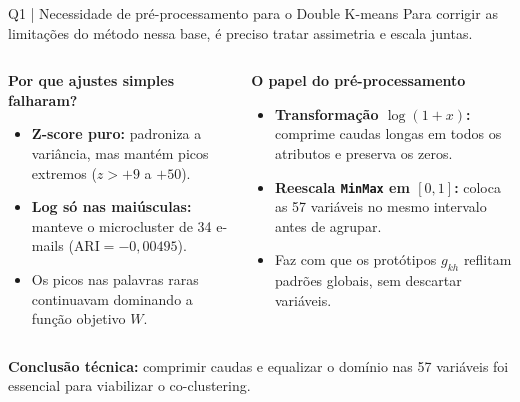 \documentclass[aspectratio=169,11pt]{beamer}
\begin{document}
\begin{frame}[t]{Q1 | Necessidade de pré-processamento para o Double K-means}
\small\color{cinzaescuro}Para corrigir as limitações do método nessa base, é preciso tratar assimetria e escala juntas.
\vspace{1mm}
\begin{columns}[T,onlytextwidth]
\begin{simplebox}
\textbf{Por que ajustes simples falharam?}\par\vspace{1mm}
\footnotesize
\begin{itemize}\setlength\itemsep{1.2mm}
\item \textbf{Z-score puro:} padroniza a variância, mas mantém picos extremos ($z > +9$ a $+50$).
\item \textbf{Log só nas maiúsculas:} manteve o microcluster de 34 e-mails ($\text{ARI} = -0,00495$).
\item Os picos nas palavras raras continuavam dominando a função objetivo $W$.
\end{itemize}
\end{simplebox}
\begin{simplebox}
\textbf{O papel do pré-processamento}\par\vspace{1mm}
\footnotesize
\begin{itemize}\setlength\itemsep{1.2mm}
\item \textbf{Transformação $\log(1+x)$:} comprime caudas longas em todos os atributos e preserva os zeros.
\item \textbf{Reescala \texttt{MinMax} em $[0,1]$:} coloca as 57 variáveis no mesmo intervalo antes de agrupar.
\item Faz com que os protótipos $g_{kh}$ reflitam padrões globais, sem descartar variáveis.
\end{itemize}
\end{simplebox}
\end{columns}
\vspace{1mm}
{\footnotesize\color{cinazul}\textbf{Conclusão técnica:} comprimir caudas e equalizar o domínio nas 57 variáveis foi essencial para viabilizar o co-clustering.}
\end{frame}
\end{document}
